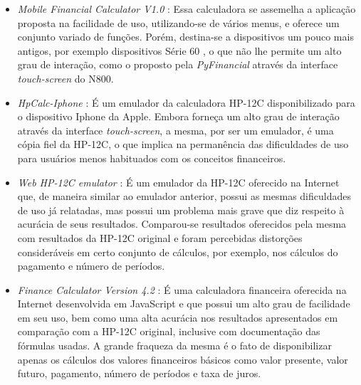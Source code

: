 \begin{itemize}

 \item \textit{Mobile Financial Calculator V1.0} \cite{mobcalc}: Essa calculadora se assemelha a aplicação proposta na facilidade de uso, utilizando-se de vários menus, e oferece um conjunto variado de funções. Porém, destina-se a dispositivos um pouco mais antigos, por exemplo dispositivos Série 60 \cite{s60}, o que não lhe permite um alto grau de interação, como o proposto pela \textit{PyFinancial} através da interface \textit{touch-screen} do N800.

 \item \textit{HpCalc-Iphone} \cite{hpiphone}: É um emulador da calculadora HP-12C disponibilizado para o dispositivo Iphone da Apple. Embora forneça um alto grau de interação através da interface \textit{touch-screen}, a mesma, por ser um emulador, é uma cópia fiel da HP-12C, o que implica na permanência das dificuldades de uso para usuários menos habituados com os conceitos financeiros.

 \item \textit{Web HP-12C emulator} \cite{epxcalc}: É um emulador da HP-12C oferecido na Internet que, de maneira similar ao emulador anterior, possui as mesmas dificuldades de uso já relatadas, mas possui um problema mais grave que diz respeito à acurácia de seus resultados. Comparou-se resultados oferecidos pela mesma com resultados da HP-12C original e foram percebidas distorções consideráveis em certo conjunto de cálculos, por exemplo, nos cálculos do pagamento e número de períodos.

 \item \textit{Finance Calculator Version 4.2} \cite{arachnoid}: É uma calculadora financeira oferecida na Internet desenvolvida em JavaScript e que possui um alto grau de facilidade em seu uso, bem como uma alta acurácia nos resultados apresentados em comparação com a HP-12C original, inclusive com documentação das fórmulas usadas. A grande fraqueza da mesma é o fato de disponibilizar apenas os cálculos dos valores financeiros básicos como valor presente, valor futuro, pagamento, número de períodos e taxa de juros.

\end{itemize}

